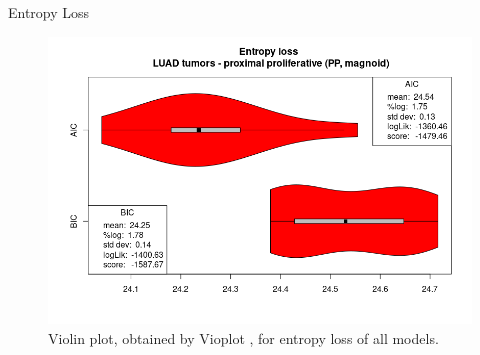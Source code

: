 \documentclass{beamer}
\begin{document}
\begin{frame}{Entropy Loss}
\begin{figure}
    \includegraphics[scale = 0.215]{img/vioplot_PP.png}
    \caption{Violin plot, obtained by Vioplot \cite{vioplot}, for entropy loss
      of all models.} 
  \end{figure}
\end{frame}
\end{document}
